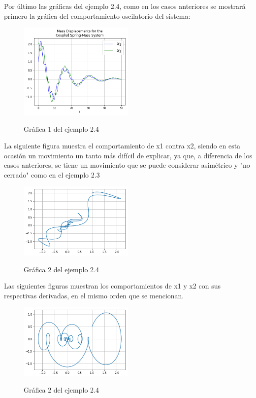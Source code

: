\documentclass{article}
\begin{document}
Por último las gráficas del ejemplo 2.4, como en los casos anteriores se mostrará primero la gráfica del comportamiento oscilatorio del sistema:
\begin{figure}[H]
    \caption{Gráfica 1 del ejemplo 2.4}
    \includegraphics[width=0.5\textwidth]{Grafica10.png}
    \centering
    \label{Cod}
\end{figure}
La siguiente figura muestra el comportamiento de x1 contra x2, siendo en esta ocasión un movimiento un tanto más difícil de explicar, ya que, a diferencia de los casos anteriores, se tiene un movimiento que se puede considerar asimétrico y "no cerrado" como en el ejemplo 2.3
\begin{figure}[H]
    \caption{Gráfica 2 del ejemplo 2.4}
    \includegraphics[width=0.5\textwidth]{Grafica11.png}
    \centering
    \label{Cod}
\end{figure}
Las siguientes figuras muestran los comportamientos de x1 y x2 con sus respectivas derivadas, en el mismo orden que se mencionan.
\begin{figure}[H]
    \caption{Gráfica 2 del ejemplo 2.4}
    \includegraphics[width=0.5\textwidth]{Grafica12.png}
    \centering
    \label{Cod}
\end{figure}
\end{document}
